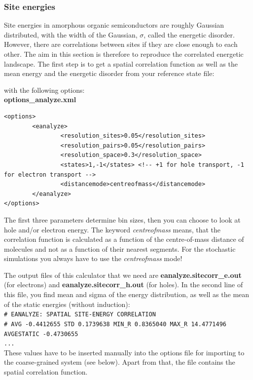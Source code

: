 \subsubsection{Site energies}

Site energies in amorphous organic semiconductors are roughly Gaussian distributed, with the width of the Gaussian, $\sigma$, called the energetic disorder. However, there are correlations between sites if they are close enough to each other. The aim in this section is therefore to reproduce the correlated energetic landscape.
The first step is to get a spatial correlation function as well as the mean energy and the energetic disorder from your reference state file:
\\

with the following options:
\\

\textbf{options\_analyze.xml}

\lstset{language=XML2}
\begin{lstlisting}
<options>
        <eanalyze>
                <resolution_sites>0.05</resolution_sites>
                <resolution_pairs>0.05</resolution_pairs>
                <resolution_space>0.3</resolution_space>
                <states>1,-1</states> <!-- +1 for hole transport, -1 for electron transport -->
                <distancemode>centreofmass</distancemode>
        </eanalyze>
</options>
\end{lstlisting}

The first three parameters determine bin sizes, then you can choose to look at hole and/or electron energy. The keyword \emph{centreofmass} means, that the correlation function is calculated as a function of the centre-of-mass distance of molecules and not as a function of their nearest segments. For the stochastic simulations you always have to use the \emph{centreofmass} mode!

The output files of this calculator that we need are \textbf{eanalyze.sitecorr\_e.out} (for electrons) and \textbf{eanalyze.sitecorr\_h.out} (for holes). In the second line of this file, you find mean and sigma of the energy distribution, as well as the mean of the static energies (without induction):
\\

\texttt{\# EANALYZE: SPATIAL SITE-ENERGY CORRELATION\\
\# AVG -0.4412655 STD 0.1739638 MIN\_R 0.8365040 MAX\_R 14.4771496  AVGESTATIC -0.4730655\\
...}
\\
These values have to be inserted manually into the options file for importing to the coarse-grained system (see below). Apart from that, the file contains the spatial correlation function.\\

